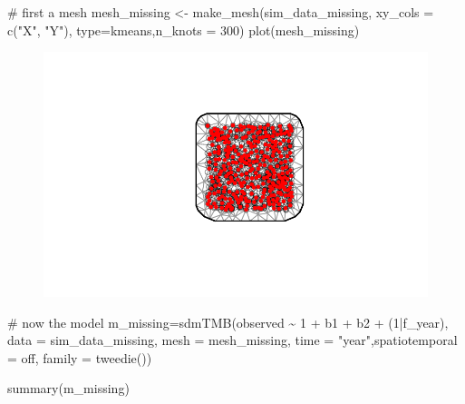 \documentclass[
  letterpaper,
  DIV=11,
  numbers=noendperiod]{scrartcl}
\newenvironment{Shaded}{\begin{snugshade}}{\end{snugshade}}
\newcommand{\AttributeTok}[1]{\textcolor[rgb]{0.40,0.45,0.13}{#1}}
\newcommand{\CommentTok}[1]{\textcolor[rgb]{0.37,0.37,0.37}{#1}}
\newcommand{\DecValTok}[1]{\textcolor[rgb]{0.68,0.00,0.00}{#1}}
\newcommand{\FunctionTok}[1]{\textcolor[rgb]{0.28,0.35,0.67}{#1}}
\newcommand{\NormalTok}[1]{\textcolor[rgb]{0.00,0.23,0.31}{#1}}
\newcommand{\OtherTok}[1]{\textcolor[rgb]{0.00,0.23,0.31}{#1}}
\newcommand{\SpecialCharTok}[1]{\textcolor[rgb]{0.37,0.37,0.37}{#1}}
\newcommand{\StringTok}[1]{\textcolor[rgb]{0.13,0.47,0.30}{#1}}
\begin{document}
\begin{Shaded}
\begin{Highlighting}[]
\CommentTok{\# first a mesh}
\NormalTok{mesh\_missing }\OtherTok{\textless{}{-}} \FunctionTok{make\_mesh}\NormalTok{(sim\_data\_missing, }\AttributeTok{xy\_cols =} \FunctionTok{c}\NormalTok{(}\StringTok{"X"}\NormalTok{, }\StringTok{"Y"}\NormalTok{), }\AttributeTok{type=}\StringTok{\textquotesingle{}kmeans\textquotesingle{}}\NormalTok{,}\AttributeTok{n\_knots =} \DecValTok{300}\NormalTok{)}
\FunctionTok{plot}\NormalTok{(mesh\_missing)}
\end{Highlighting}
\end{Shaded}

\begin{figure}[H]

{\centering \includegraphics{simulation_sdmTMB_files/figure-pdf/unnamed-chunk-5-1.pdf}

}

\end{figure}

\begin{Shaded}
\begin{Highlighting}[]
\CommentTok{\# now the model}
\NormalTok{m\_missing}\OtherTok{=}\FunctionTok{sdmTMB}\NormalTok{(observed }\SpecialCharTok{\textasciitilde{}} \DecValTok{1} \SpecialCharTok{+}\NormalTok{ b1 }\SpecialCharTok{+}\NormalTok{ b2 }\SpecialCharTok{+}\NormalTok{ (}\DecValTok{1}\SpecialCharTok{|}\NormalTok{f\_year),}
              \AttributeTok{data =}\NormalTok{ sim\_data\_missing, }\AttributeTok{mesh =}\NormalTok{ mesh\_missing, }\AttributeTok{time =} \StringTok{"year"}\NormalTok{,}\AttributeTok{spatiotemporal =} \StringTok{\textquotesingle{}off\textquotesingle{}}\NormalTok{,}
              \AttributeTok{family =} \FunctionTok{tweedie}\NormalTok{())}

\FunctionTok{summary}\NormalTok{(m\_missing)}
\end{Highlighting}
\end{Shaded}
\end{document}
